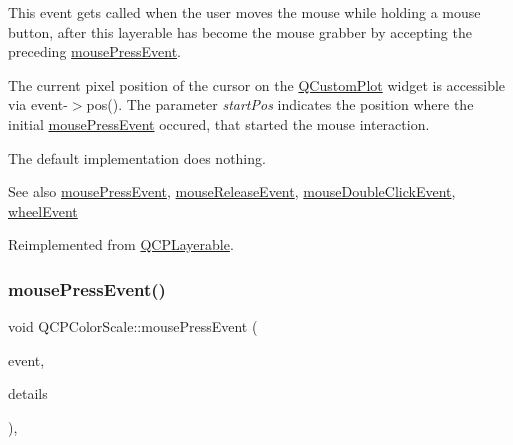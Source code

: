 This event gets called when the user moves the mouse while holding a mouse button, after this layerable has become the mouse grabber by accepting the preceding \mbox{\hyperlink{class_q_c_p_color_scale_a91f633b97ffcd57fdf8cd814974c20e6}{mouse\+Press\+Event}}.

The current pixel position of the cursor on the \mbox{\hyperlink{class_q_custom_plot}{Q\+Custom\+Plot}} widget is accessible via {\ttfamily event-\/$>$pos()}. The parameter {\itshape start\+Pos} indicates the position where the initial \mbox{\hyperlink{class_q_c_p_color_scale_a91f633b97ffcd57fdf8cd814974c20e6}{mouse\+Press\+Event}} occured, that started the mouse interaction.

The default implementation does nothing.

\begin{DoxySeeAlso}{See also}
\mbox{\hyperlink{class_q_c_p_color_scale_a91f633b97ffcd57fdf8cd814974c20e6}{mouse\+Press\+Event}}, \mbox{\hyperlink{class_q_c_p_color_scale_a6a35dd39ab4e5cb2d7b29ebb4d5b61b0}{mouse\+Release\+Event}}, \mbox{\hyperlink{class_q_c_p_layerable_a4171e2e823aca242dd0279f00ed2de81}{mouse\+Double\+Click\+Event}}, \mbox{\hyperlink{class_q_c_p_color_scale_a63cf19be184f6670c9495ad3a9a1baeb}{wheel\+Event}} 
\end{DoxySeeAlso}


Reimplemented from \mbox{\hyperlink{class_q_c_p_layerable_a9eee1ba47fd69be111059ca3881933e4}{Q\+C\+P\+Layerable}}.

\mbox{\label{class_q_c_p_color_scale_a91f633b97ffcd57fdf8cd814974c20e6}} 
\subsubsection{\texorpdfstring{mouse\+Press\+Event()}{mousePressEvent()}}
{\footnotesize\ttfamily void Q\+C\+P\+Color\+Scale\+::mouse\+Press\+Event (\begin{DoxyParamCaption}\item[{Q\+Mouse\+Event $\ast$}]{event,  }\item[{const Q\+Variant \&}]{details }\end{DoxyParamCaption})\hspace{0.3cm}{\ttfamily [protected]}, {\ttfamily [virtual]}}

